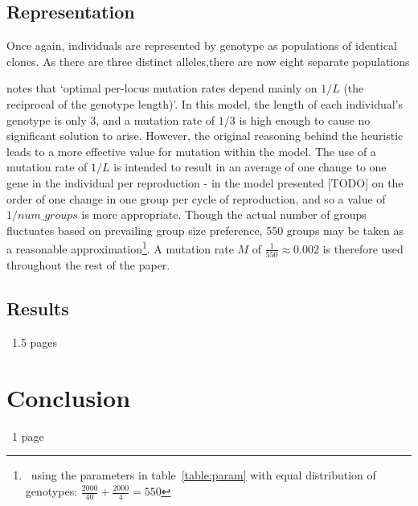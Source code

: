 \documentclass[11pt]{article}
\begin{document}
\subsection{Representation}
Once again, individuals are represented by genotype as populations of identical clones. As there are three distinct alleles,there are now eight separate populations

\citet{optimal} notes that `optimal per-locus mutation rates depend mainly on $1/L$ (the reciprocal of the genotype length)'. In this model, the length of each individual's genotype is only 3, and a mutation rate of $1/3$ is high enough to cause no significant solution to arise. %
However, the original reasoning behind the heuristic leads to a more effective value for mutation within the model. The use of a mutation rate of $1/L$ is intended to result in an average of one change to one gene in the individual per reproduction - in the model presented [TODO]%
on the order of one change in one group per cycle of reproduction, and so a value of $1/num\_groups$ is more appropriate. Though the actual number of groups fluctuates based on prevailing group size preference, 550 groups may be taken as a reasonable approximation\footnote{~using the parameters in table~\ref{table:param} with equal distribution of genotypes: $\frac{2000}{40} + \frac{2000}{4} = 550$}. A mutation rate $M$ of $\frac{1}{550} \approx 0.002$ is therefore used throughout the rest of the paper.
\subsection{Results}
~1.5 pages

\section{Conclusion}
~1 page


{}

\end{document}
